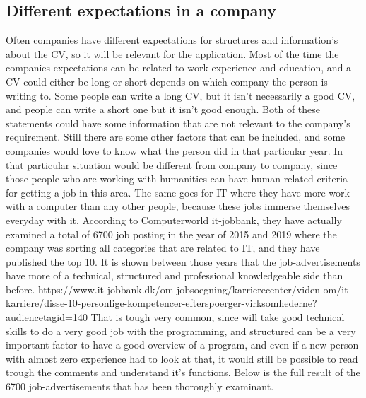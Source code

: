 



\subsection{Different expectations in a company}
Often companies have different expectations for structures and information's about the CV, so it will be relevant for the application.
Most of the time the companies expectations can be related to work experience and education,
and a CV could either be long or short depends on which company the person is writing to. Some people can write a long CV,
but it isn't necessarily a good CV, and people can write a short one but it isn't good enough.
Both of these statements could have some information that are not relevant to the company's requirement. Still there are some other
factors that can be included, and some companies would love to know what the person did in that particular year.
In that particular situation would be different from company to company, since those people who are working with humanities
can have human related criteria for getting a job in this area. The same goes for IT where they have more work with a computer
than any other people, because these jobs immerse themselves everyday with it. According to Computerworld it-jobbank,
they have actually examined a total of 6700 job posting in the year of 2015 and 2019 where the company was sorting all categories
that are related to IT, and they have published the top 10. It is shown between those years that the job-advertisements
have more of a technical, structured and professional knowledgeable side than before.
https://www.it-jobbank.dk/om-jobsoegning/karrierecenter/viden-om/it-karriere/disse-10-personlige-kompetencer-efterspoerger-virksomhederne?audiencetagid=140
That is tough very common, since will take good technical skills to do a very good job with the programming,
and structured can be a very important factor to have a good overview of a program,
and even if a new person with almost zero experience had to look at that,
it would still be possible to read trough the comments and understand it's functions. Below is the full result
of the 6700 job-advertisements that has been thoroughly examinant.

